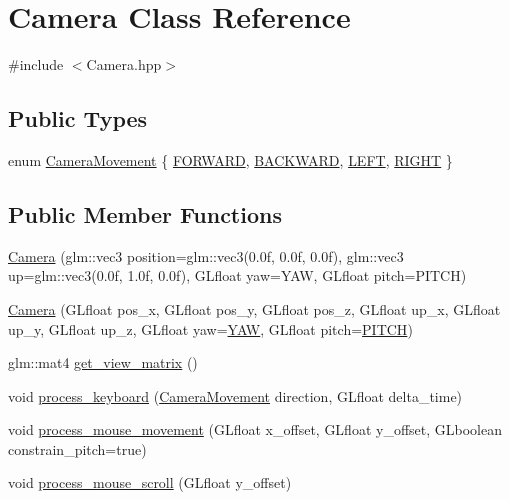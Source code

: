 \hypertarget{classCamera}{\section{Camera Class Reference}
\label{classCamera}
}


{\ttfamily \#include $<$Camera.\-hpp$>$}

\subsection*{Public Types}
\begin{DoxyCompactItemize}
\item 
enum \hyperlink{classCamera_a9825f2bf1ddc209c3b2d336080d8407a}{Camera\-Movement} \{ \hyperlink{classCamera_a9825f2bf1ddc209c3b2d336080d8407aa6388b5408cf8440021383388044ae77f}{F\-O\-R\-W\-A\-R\-D}, 
\hyperlink{classCamera_a9825f2bf1ddc209c3b2d336080d8407aae18db08a2289896f26dcddf6e2ad274f}{B\-A\-C\-K\-W\-A\-R\-D}, 
\hyperlink{classCamera_a9825f2bf1ddc209c3b2d336080d8407aa1bed5588ea4c26163a72f0fc8621f6be}{L\-E\-F\-T}, 
\hyperlink{classCamera_a9825f2bf1ddc209c3b2d336080d8407aaedac3a8506bf2bae7df2d36dd5580884}{R\-I\-G\-H\-T}
 \}
\end{DoxyCompactItemize}
\subsection*{Public Member Functions}
\begin{DoxyCompactItemize}
\item 
\hyperlink{classCamera_a535f3a2413a88c2f1e7d1147bec0039c}{Camera} (glm\-::vec3 position=glm\-::vec3(0.\-0f, 0.\-0f, 0.\-0f), glm\-::vec3 up=glm\-::vec3(0.\-0f, 1.\-0f, 0.\-0f), G\-Lfloat yaw=\-Y\-A\-W, G\-Lfloat pitch=\-P\-I\-T\-C\-H)
\item 
\hyperlink{classCamera_af0f6ba09d293db5b1c6ba63d195cff57}{Camera} (G\-Lfloat pos\-\_\-x, G\-Lfloat pos\-\_\-y, G\-Lfloat pos\-\_\-z, G\-Lfloat up\-\_\-x, G\-Lfloat up\-\_\-y, G\-Lfloat up\-\_\-z, G\-Lfloat yaw=\hyperlink{classCamera_a79050e94e98c5c1cc0127c41edb4ed16}{Y\-A\-W}, G\-Lfloat pitch=\hyperlink{classCamera_afd43f32a47d2db8922dc32030fd84379}{P\-I\-T\-C\-H})
\item 
glm\-::mat4 \hyperlink{classCamera_aedac0150156798ae1880eabaa3b9f071}{get\-\_\-view\-\_\-matrix} ()
\item 
void \hyperlink{classCamera_ac32b5b8c93934f8faa8e8637dec855d4}{process\-\_\-keyboard} (\hyperlink{classCamera_a9825f2bf1ddc209c3b2d336080d8407a}{Camera\-Movement} direction, G\-Lfloat delta\-\_\-time)
\item 
void \hyperlink{classCamera_ab650c0e1f0c55582339623e7c3b4b10d}{process\-\_\-mouse\-\_\-movement} (G\-Lfloat x\-\_\-offset, G\-Lfloat y\-\_\-offset, G\-Lboolean constrain\-\_\-pitch=true)
\item 
void \hyperlink{classCamera_a9cb2efbeb1a0007f1ea908e3e74c92a1}{process\-\_\-mouse\-\_\-scroll} (G\-Lfloat y\-\_\-offset)
\end{DoxyCompactItemize}

